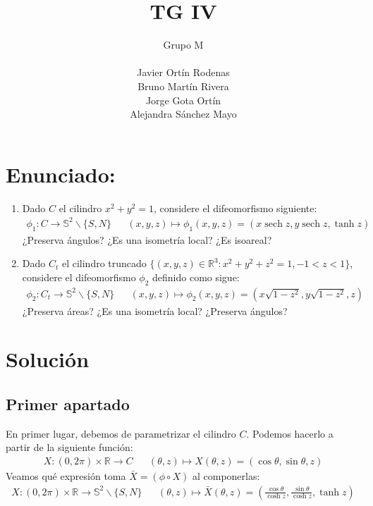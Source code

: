\documentclass{article}
\title{TG IV}
\author{
    \large{Grupo M} \\\\
    Javier Ortín Rodenas \\
    Bruno Martín Rivera \\
    Jorge Gota Ortín \\
    Alejandra Sánchez Mayo
}
\date{}
\newcommand{\sech}[1]{\operatorname{sech} #1}
\begin{document}
\maketitle
\noindent
\section{Enunciado:}
\begin{enumerate}
    \item Dado $C$ el cilindro $x^2 + y^2 = 1$, considere el difeomorfismo siguiente:
        \begin{align*}
            \phi_1 : C \longrightarrow \mathbb{S}^2\backslash\{S, N\} &&
            (x,y,z) \longmapsto \phi_1(x,y,z) = \left(x \sech{z}, y \sech{z}, \tanh{z}\right)
        \end{align*}
        ¿Preserva ángulos? ¿Es una isometría local? ¿Es isoareal?
        \\
    \item Dado $C_t$ el cilindro truncado $\{(x,y,z) \in \mathbb{R}^3 : x^2 + y^2 + z^2 = 1, -1<z<1\}$,
        considere el difeomorfismo $\phi_2$ definido como sigue:
        \begin{align*}
            \phi_2 : C_t \longrightarrow \mathbb{S}^2\backslash\{S, N\} &&
            (x,y,z) \longmapsto \phi_2(x,y,z) = \left(x \sqrt{1-z^2}, y\sqrt{1-z^2} ,z\right)
        \end{align*}           
        ¿Preserva áreas? ¿Es una isometría local? ¿Preserva ángulos?
\end{enumerate}

\section{Solución}
\subsection{Primer apartado}
\hspace{1mm} En primer lugar, debemos de parametrizar el cilindro $C$.
Podemos hacerlo a partir de la siguiente función:
\begin{align*}
    X : (0, 2\pi) \times \mathbb{R} \longrightarrow C&&
    (\theta, z) \longmapsto X(\theta, z) = \left(\cos\theta, \sin\theta, z\right)
\end{align*}
\vspace{1mm}
Veamos qué expresión toma $\bar{X} = (\phi \circ X)$ al componerlas:
\begin{align*}
    X : (0, 2\pi) \times \mathbb{R} \longrightarrow \mathbb{S}^2 \backslash \{S,N\}&&
    (\theta, z) \longmapsto \bar{X}(\theta, z) =
        \left(\frac{\cos \theta}{\cosh z}, \frac{\sin \theta}{\cosh z}, \tanh z\right)
\end{align*}
\end{document}
